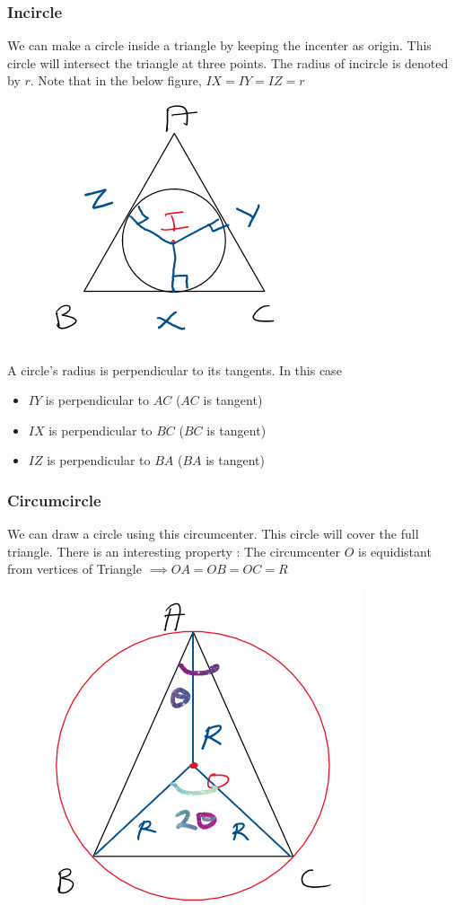 \subsubsection{Incircle}
We can make a circle inside a triangle by keeping the incenter as origin. This circle will intersect the triangle at three points. The radius of incircle is denoted by $r$. Note that in the below figure, $IX = IY = IZ = r$

\begin{figure}[h!]
    \centering
    \includegraphics[width=0.4\linewidth]{Quant//Geometry//Images//Triangles/incircle.png}    
\end{figure}

A circle's radius is perpendicular to its tangents. In this case
\begin{itemize}
    \item $IY$ is perpendicular to $AC$ ($AC$ is tangent)
    \item $IX$ is perpendicular to $BC$ ($BC$ is tangent)
    \item $IZ$ is perpendicular to $BA$ ($BA$ is tangent)
\end{itemize}

\subsubsection{Circumcircle}
We can draw a circle using this circumcenter. This circle will cover the full triangle. There is an interesting property : The circumcenter $O$ is equidistant from vertices of Triangle $\implies OA = OB = OC = R$

\begin{figure}[h!]
    \centering
    \includegraphics[width=0.38\linewidth]{Quant//Geometry//Images//Triangles/circumcircle.png}
\end{figure}

